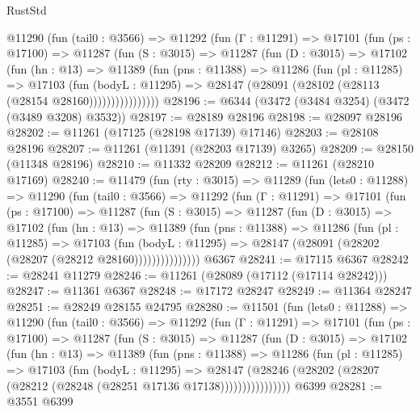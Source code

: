 \begin{lexlean}{RustStd}
\begin{coremodule}
        @11290
          (fun (tail0 : @3566) =>
          @11292
            (fun (Γ : @11291) =>
            @17101
              (fun (ps : @17100) =>
              @11287
                (fun (S : @3015) =>
                @11287
                  (fun (D : @3015) =>
                  @17102
                    (fun (hn : @13) =>
                    @11389
                      (fun (pns : @11388) =>
                      @11286
                        (fun (pl : @11285) =>
                        @17103
                          (fun (bodyL : @11295) =>
                          @28147 (@28091 (@28102 (@28113 (@28154 @28160))))))))))))))))
@28196 := @6344 (@3472 (@3484 @3254) (@3472 (@3489 @3208) @3532))
@28197 := @28189 @28196
@28198 := @28097 @28196
@28202 := @11261 (@17125 (@28198 @17139) @17146)
@28203 := @28108 @28196
@28207 := @11261 (@11391 (@28203 @17139) @3265)
@28209 := @28150 (@11348 @28196)
@28210 := @11332 @28209
@28212 := @11261 (@28210 @17169)
@28240 := @11479
    (fun (rty : @3015) =>
    @11289
      (fun (lets0 : @11288) =>
      @11290
        (fun (tail0 : @3566) =>
        @11292
          (fun (Γ : @11291) =>
          @17101
            (fun (ps : @17100) =>
            @11287
              (fun (S : @3015) =>
              @11287
                (fun (D : @3015) =>
                @17102
                  (fun (hn : @13) =>
                  @11389
                    (fun (pns : @11388) =>
                    @11286
                      (fun (pl : @11285) =>
                      @17103
                        (fun (bodyL : @11295) =>
                        @28147 (@28091 (@28202 (@28207 (@28212 @28160)))))))))))))))
    @6367
@28241 := @17115 @6367
@28242 := @28241 @11279
@28246 := @11261 (@28089 (@17112 (@17114 @28242)))
@28247 := @11361 @6367
@28248 := @17172 @28247
@28249 := @11364 @28247
@28251 := @28249 @28155 @24795
@28280 := @11501
    (fun (lets0 : @11288) =>
    @11290
      (fun (tail0 : @3566) =>
      @11292
        (fun (Γ : @11291) =>
        @17101
          (fun (ps : @17100) =>
          @11287
            (fun (S : @3015) =>
            @11287
              (fun (D : @3015) =>
              @17102
                (fun (hn : @13) =>
                @11389
                  (fun (pns : @11388) =>
                  @11286
                    (fun (pl : @11285) =>
                    @17103
                      (fun (bodyL : @11295) =>
                      @28147
                        (@28246
                          (@28202 (@28207 (@28212 (@28248 (@28251 @17136 @17138))))))))))))))))
    @6399
@28281 := @3551 @6399

\end{coremodule}
\end{lexlean}
